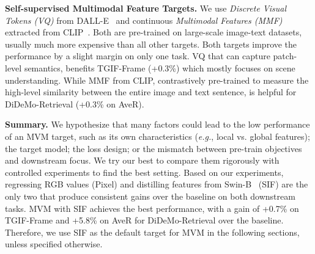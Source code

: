 \documentclass[10pt,twocolumn,letterpaper]{article}
\begin{document}
\vspace{0.5ex}
\noindent \textbf{Self-supervised Multimodal Feature Targets.} We use \textit{Discrete Visual Tokens (VQ)} from DALL-E~\cite{ramesh2021dalle} and continuous \textit{Multimodal Features (MMF)} extracted from CLIP~\cite{radford2021clip}. Both are pre-trained on large-scale image-text datasets, usually much more expensive than all other targets. Both targets improve the performance by a slight margin on only one task. VQ that can capture patch-level semantics, benefits TGIF-Frame (+0.3\%) which mostly focuses on scene understanding. While MMF from CLIP, contrastively pre-trained to measure the high-level similarity between the entire image and text sentence, is helpful for DiDeMo-Retrieval (+0.3\% on AveR). 

\vspace{0.5ex}
\noindent \textbf{Summary.} 
We hypothesize that many factors could lead to the low performance of an MVM target, such as its own characteristics (\textit{e.g.}, local vs. global features); the target model; the loss design; or the mismatch between pre-train objectives and downstream focus. We try our best to compare them rigorously with controlled experiments to find the best setting. Based on our experiments, regressing RGB values (Pixel) and distilling features from Swin-B~\cite{liu2021swin} (SIF) are the only two that produce consistent gains over the baseline on both downstream tasks. MVM with SIF achieves the best performance, with a gain of +0.7\% on TGIF-Frame and +5.8\% on AveR for DiDeMo-Retrieval over the baseline. Therefore, we use SIF as the default target for MVM in the following sections, unless specified otherwise.
\end{document}
